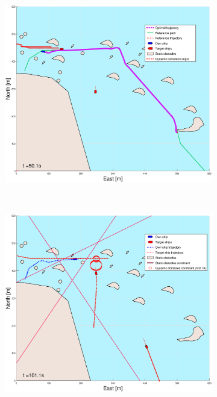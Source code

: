 \begin{figure}[!ht]
    \hfill
    \begin{subfigure}[b]{0.494\textwidth}
        \centering
        \includegraphics[width=\textwidth]{Images/Figures/skjergard_m_trafikk_NEW/_Simple_0fig999_time=50}
        \subcaption{}
    \end{subfigure}
    \hfill
    \\
    \begin{subfigure}[b]{0.494\textwidth}
        \centering
        \includegraphics[width=\textwidth]{Images/Figures/skjergard_m_trafikk_NEW/_Simple_0fig1_time=101}

\end{subfigure}
\end{figure}
